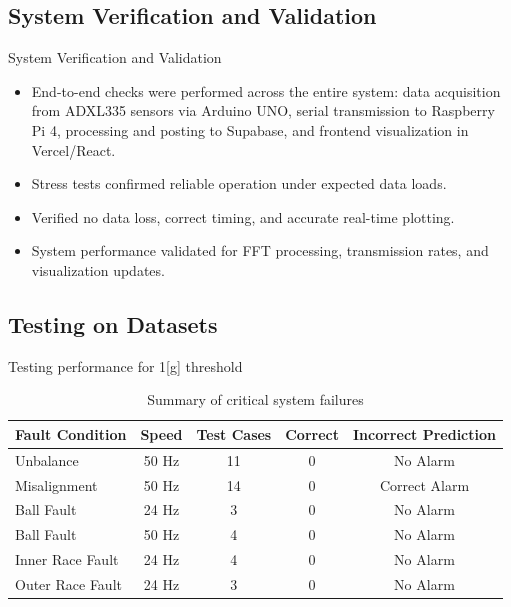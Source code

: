 \documentclass{beamer}
\begin{document}
	\subsection{System Verification and Validation}
	\begin{frame}{System Verification and Validation}
		\begin{itemize}[<+-| alert@+>]
			\item End-to-end checks were performed across the entire system: data acquisition from ADXL335 sensors via Arduino UNO, serial transmission to Raspberry Pi 4, processing and posting to Supabase, and frontend visualization in Vercel/React.
			\item Stress tests confirmed reliable operation under expected data loads.
			\item Verified no data loss, correct timing, and accurate real-time plotting.
			\item System performance validated for FFT processing, transmission rates, and visualization updates.
		\end{itemize}
	\end{frame}
	
	\subsection{Testing on Datasets}
	\begin{frame}{Testing performance for 1[g] threshold}
		\begin{table}[ht]
			\centering
			\caption{Summary of critical system failures}
			\label{tab:critical_failures}
			\begin{tabular}{lcccc}
				\hline
				Fault Condition & Speed & Test Cases & Correct & Incorrect Prediction \\
				\hline
				Unbalance & 50 Hz & 11 & 0 & No Alarm \\
				Misalignment & 50 Hz & 14 & 0 & Correct Alarm \\
				Ball Fault & 24 Hz & 3 & 0 & No Alarm \\
				Ball Fault & 50 Hz & 4 & 0 & No Alarm \\
				Inner Race Fault & 24 Hz & 4 & 0 & No Alarm \\
				Outer Race Fault & 24 Hz & 3 & 0 & No Alarm \\
				\hline
			\end{tabular}
		\end{table}
	\end{frame}
	
\end{document}
